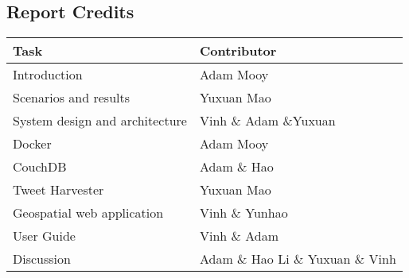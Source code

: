 \subsection{Report Credits}
\begin{center}
\begin{tabular}{|l|l|}
\hline
\textbf{Task} & \textbf{Contributor} \\
\hline
Introduction                   & Adam Mooy \\ 
Scenarios and results          & Yuxuan Mao \\ 
System design and architecture & Vinh \& Adam \&Yuxuan \\ 
Docker                         & Adam Mooy \\ 
CouchDB                        & Adam \& Hao \\ 
Tweet Harvester                & Yuxuan Mao \\ 
Geospatial web application     & Vinh \& Yunhao \\ 
User Guide                     & Vinh \& Adam \\ 
Discussion                     & Adam \& Hao Li \& Yuxuan \& Vinh \\ 
\hline
\end{tabular}
\end{center}
